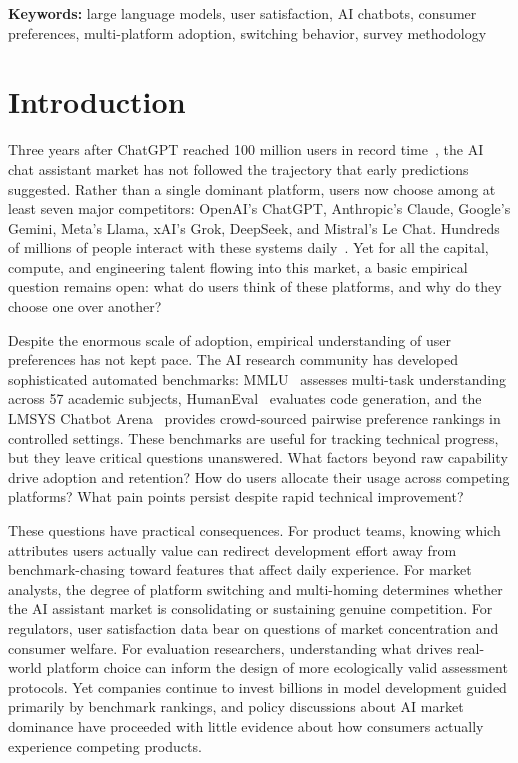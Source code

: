 \documentclass[10pt,twocolumn]{article}
\begin{document}
\noindent\textbf{Keywords:} large language models, user satisfaction, AI chatbots, consumer preferences, multi-platform adoption, switching behavior, survey methodology
\vspace{6pt}


\section{Introduction}

Three years after ChatGPT reached 100 million users in record time~\cite{hu2023}, the AI chat assistant market has not followed the trajectory that early predictions suggested. Rather than a single dominant platform, users now choose among at least seven major competitors: OpenAI's ChatGPT, Anthropic's Claude, Google's Gemini, Meta's Llama, xAI's Grok, DeepSeek, and Mistral's Le Chat. Hundreds of millions of people interact with these systems daily~\cite{similarweb2024}. Yet for all the capital, compute, and engineering talent flowing into this market, a basic empirical question remains open: what do users think of these platforms, and why do they choose one over another?

Despite the enormous scale of adoption, empirical understanding of user preferences has not kept pace. The AI research community has developed sophisticated automated benchmarks: MMLU~\cite{hendrycks2021} assesses multi-task understanding across 57 academic subjects, HumanEval~\cite{chen2021} evaluates code generation, and the LMSYS Chatbot Arena~\cite{chiang2024} provides crowd-sourced pairwise preference rankings in controlled settings. These benchmarks are useful for tracking technical progress, but they leave critical questions unanswered. What factors beyond raw capability drive adoption and retention? How do users allocate their usage across competing platforms? What pain points persist despite rapid technical improvement?

These questions have practical consequences. For product teams, knowing which attributes users actually value can redirect development effort away from benchmark-chasing toward features that affect daily experience. For market analysts, the degree of platform switching and multi-homing determines whether the AI assistant market is consolidating or sustaining genuine competition. For regulators, user satisfaction data bear on questions of market concentration and consumer welfare. For evaluation researchers, understanding what drives real-world platform choice can inform the design of more ecologically valid assessment protocols. Yet companies continue to invest billions in model development guided primarily by benchmark rankings, and policy discussions about AI market dominance have proceeded with little evidence about how consumers actually experience competing products.
\end{document}
